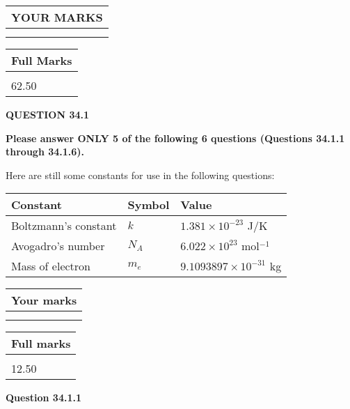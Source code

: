 \documentclass[12pt]{article}
\begin{document}
 
   
   
  
\vspace{0.2in}
  
\noindent\begin{tabular}{|l|}
\hline
 YOUR MARKS  \\
\hline
 \\ 
 \\ 
\hline
\end{tabular}
\hspace{0.05in} \begin{tabular}{|l|}
\hline
 Full Marks  \\
\hline
 \\ 
62.50 \\
\hline
\end{tabular}
{\textbf{\Large{QUESTION
34.1 
}}}
  
  
 
{\textbf{\Large{Please answer ONLY
5 of the following
6 questions (Questions
34.1.1 through
34.1.6). }}}
 
Here are still some constants for use in the following questions:
 
 
\noindent\begin{tabular}{|l|l|l|}
\hline
Constant & Symbol & Value \\
\hline
 
Boltzmann's constant &
$k$ &
 $ 1.381 \times 10^{-23} $
J/K \\
\hline
 
Avogadro's number &
$N_A$ &
 $ 6.022 \times 10^{23} $
mol$^{-1}$ \\
\hline
 
Mass of electron &
$m_e$ &
 $ 9.1093897 \times 10^{-31} $
kg \\
\hline
 
\end{tabular}
 
  
\vspace{0.2in}
  
         \begin{tabular}{|l|}
\hline
 Your marks  \\
\hline
 \\ 
 \\ 
\hline
\end{tabular}
\hspace{0.05in} \begin{tabular}{|l|}
\hline
 Full marks  \\
\hline
 \\ 
12.50 \\
\hline
\end{tabular}
{\textbf{\Large{Question
34.1.1 
}}}
  
\end{document}
